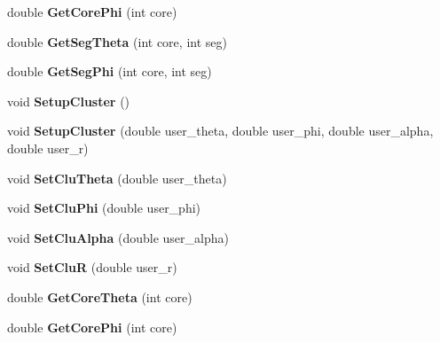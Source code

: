 \begin{DoxyCompactItemize}
double {\bfseries Get\+Core\+Phi} (int core)
\item 
\mbox{\label{class_m_b_geometry_a49cdf742a2902fc85f0b24dfffa554a8}} 
double {\bfseries Get\+Seg\+Theta} (int core, int seg)
\item 
\mbox{\label{class_m_b_geometry_a575ddd6022d2d686a83ebce3195b6c50}} 
double {\bfseries Get\+Seg\+Phi} (int core, int seg)
\item 
\mbox{\label{class_m_b_geometry_a4d98a38f0dc1ca6a4a73477dde5cdd8d}} 
void {\bfseries Setup\+Cluster} ()
\item 
\mbox{\label{class_m_b_geometry_a93f157cebad3f63dbbefb5b08f3555af}} 
void {\bfseries Setup\+Cluster} (double user\+\_\+theta, double user\+\_\+phi, double user\+\_\+alpha, double user\+\_\+r)
\item 
\mbox{\label{class_m_b_geometry_a9a2a8c9609141be92d7ba30e6087aa30}} 
void {\bfseries Set\+Clu\+Theta} (double user\+\_\+theta)
\item 
\mbox{\label{class_m_b_geometry_a74142f84cf6317d52ae39c0e0ff8a87e}} 
void {\bfseries Set\+Clu\+Phi} (double user\+\_\+phi)
\item 
\mbox{\label{class_m_b_geometry_a0d4868b0360a6e5534918a9813540015}} 
void {\bfseries Set\+Clu\+Alpha} (double user\+\_\+alpha)
\item 
\mbox{\label{class_m_b_geometry_a292c4326421c78871667e91c3694ae35}} 
void {\bfseries Set\+CluR} (double user\+\_\+r)
\item 
\mbox{\label{class_m_b_geometry_a42aa536f15017724812712b0f8a77c12}} 
double {\bfseries Get\+Core\+Theta} (int core)
\item 
\mbox{\label{class_m_b_geometry_a39f685610ae0e68e547a46f8ef992599}} 
double {\bfseries Get\+Core\+Phi} (int core)
\item 
\mbox{\label{class_m_b_geometry_a49cdf742a2902fc85f0b24dfffa554a8}} 

\end{DoxyCompactItemize}
